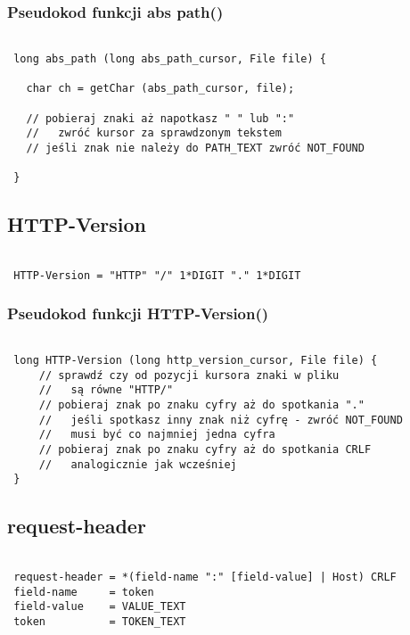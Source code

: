 \documentclass[a4paper,11pt]{report}
\begin{document}
\subsubsection{Pseudokod funkcji abs path()}

\begin{lstlisting}

 long abs_path (long abs_path_cursor, File file) {
 
   char ch = getChar (abs_path_cursor, file);
   
   // pobieraj znaki aż napotkasz " " lub ":"
   //   zwróć kursor za sprawdzonym tekstem
   // jeśli znak nie należy do PATH_TEXT zwróć NOT_FOUND
     
 }

\end{lstlisting}

\subsection{HTTP-Version}

\begin{lstlisting}

 HTTP-Version = "HTTP" "/" 1*DIGIT "." 1*DIGIT

\end{lstlisting}

\subsubsection{Pseudokod funkcji HTTP-Version()}

\begin{lstlisting}

 long HTTP-Version (long http_version_cursor, File file) {
     // sprawdź czy od pozycji kursora znaki w pliku
     //   są równe "HTTP/"
     // pobieraj znak po znaku cyfry aż do spotkania "."
     //   jeśli spotkasz inny znak niż cyfrę - zwróć NOT_FOUND
     //   musi być co najmniej jedna cyfra
     // pobieraj znak po znaku cyfry aż do spotkania CRLF
     //   analogicznie jak wcześniej
 }

\end{lstlisting}

\subsection{request-header}

\begin{lstlisting}

 request-header = *(field-name ":" [field-value] | Host) CRLF
 field-name     = token
 field-value    = VALUE_TEXT
 token          = TOKEN_TEXT

\end{lstlisting}
\end{document}
